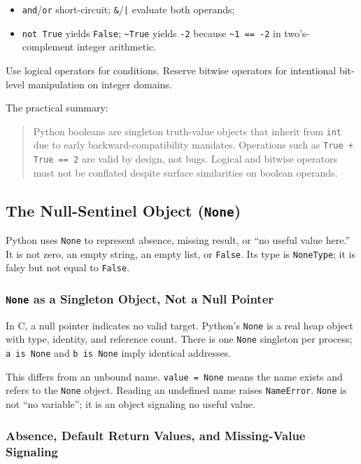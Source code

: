 \documentclass[a4paper,twoside]{report}
\begin{document}
\begin{itemize}
    \item \texttt{and}/\texttt{or} short-circuit; \texttt{\&}/\texttt{|} evaluate both operands;
    \item \texttt{not True} yields \texttt{False}; \texttt{\textasciitilde{}True} yields \texttt{-2} because \texttt{\textasciitilde{}1 == -2} in two's-complement integer arithmetic.
\end{itemize}

Use logical operators for conditions. Reserve bitwise operators for intentional bit-level manipulation on integer domains.

The practical summary:

\begin{quote}
Python booleans are singleton truth-value objects that inherit from \texttt{int} due to early backward-compatibility mandates. Operations such as \texttt{True + True == 2} are valid by design, not bugs. Logical and bitwise operators must not be conflated despite surface similarities on boolean operands.
\end{quote}


\subsection{The Null-Sentinel Object (\texttt{None})}

Python uses \texttt{None} to represent absence, missing result, or ``no useful value here.'' It is not zero, an empty string, an empty list, or \texttt{False}. Its type is \texttt{NoneType}; it is falsy but not equal to \texttt{False}.

\subsubsection{\texttt{None} as a Singleton Object, Not a Null Pointer}

In C, a null pointer indicates no valid target. Python's \texttt{None} is a real heap object with type, identity, and reference count. There is one \texttt{None} singleton per process; \texttt{a is None} and \texttt{b is None} imply identical addresses.

This differs from an unbound name. \texttt{value = None} means the name exists and refers to the \texttt{None} object. Reading an undefined name raises \texttt{NameError}. \texttt{None} is not ``no variable''; it is an object signaling no useful value.

\subsubsection{Absence, Default Return Values, and Missing-Value Signaling}
\end{document}
